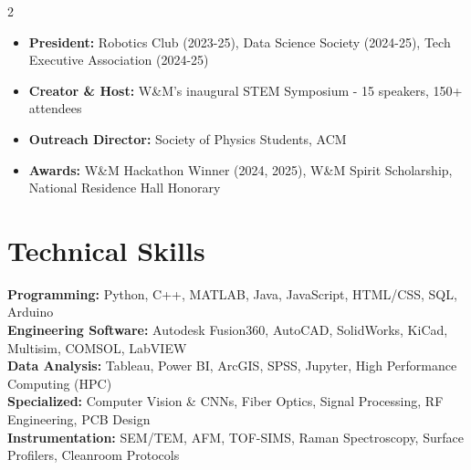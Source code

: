\documentclass[11pt,letterpaper]{article}
\begin{document}
\begin{multicols}{2}
\begin{itemize}
    \item \textbf{President:} Robotics Club (2023-25), Data Science Society (2024-25), Tech Executive Association (2024-25)
    \item \textbf{Creator \& Host:} W\&M's inaugural STEM Symposium - 15 speakers, 150+ attendees
\end{itemize}
\columnbreak
\begin{itemize}
    \item \textbf{Outreach Director:} Society of Physics Students, ACM
    \item \textbf{Awards:} W\&M Hackathon Winner (2024, 2025), W\&M Spirit Scholarship, National Residence Hall Honorary
\end{itemize}
\end{multicols}

\section{Technical Skills}

\noindent
\textbf{Programming:} Python, C++, MATLAB, Java, JavaScript, HTML/CSS, SQL, Arduino\\
\textbf{Engineering Software:} Autodesk Fusion360, AutoCAD, SolidWorks, KiCad, Multisim, COMSOL, LabVIEW\\
\textbf{Data Analysis:} Tableau, Power BI, ArcGIS, SPSS, Jupyter, High Performance Computing (HPC)\\
\textbf{Specialized:} Computer Vision \& CNNs, Fiber Optics, Signal Processing, RF Engineering, PCB Design\\
\textbf{Instrumentation:} SEM/TEM, AFM, TOF-SIMS, Raman Spectroscopy, Surface Profilers, Cleanroom Protocols
\end{document}
